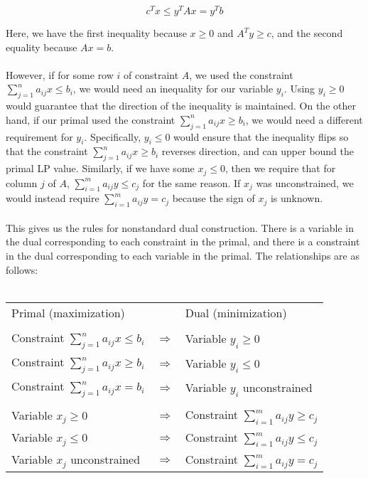 \documentclass[11pt]{article}
\begin{document}
$$ c^Tx \leq y^TAx = y^Tb $$

Here, we have the first inequality because $x \geq 0$ and $A^Ty \geq
c$, and the second equality because $Ax = b$.
\\
\\
However, if for some row $i$ of constraint $A$, we used the
constraint $\sum_{j=1}^n a_{ij} x \leq b_i$, we would need an
inequality for our variable $y_i$. Using $y_i \geq 0$ would
guarantee that the direction of the inequality is maintained. On the
other hand, if our primal used the constraint $\sum_{j=1}^n a_{ij} x
\geq b_i$, we would need a different requirement for $y_i$.
Specifically, $y_i \leq 0$ would ensure that the inequality flips so
that the constraint $\sum_{j=1}^n a_{ij} x \geq b_i$ reverses
direction, and can upper bound the primal LP value. Similarly, if we
have some $x_j \leq 0$, then we require that for column $j$ of $A$,
$\sum_{i=1}^m a_{ij} y\leq c_j$ for the same reason. If $x_j$ was
unconstrained, we would instead require $\sum_{i=1}^m a_{ij} y =
c_j$ because the sign of $x_j$ is unknown.
\\
\\
This gives us the rules for nonstandard dual construction. There is
a variable in the dual corresponding to each constraint in the
primal, and there is a constraint in the dual corresponding to each
variable in the primal. The relationships are as follows:
\\
\\
\begin{tabular}{lll}
Primal (maximization) & & Dual (minimization) \\
\\
Constraint $\sum_{j=1}^n a_{ij} x \leq b_i$ & $\Rightarrow$ & Variable $y_i \geq 0$\\
Constraint $\sum_{j=1}^n a_{ij} x \geq b_i$ & $\Rightarrow$ & Variable $y_i \leq 0$\\
Constraint $\sum_{j=1}^n a_{ij} x = b_i$ & $\Rightarrow$ & Variable $y_i$ unconstrained\\
\\
Variable $x_j \geq 0$ & $\Rightarrow$ & Constraint $\sum_{i=1}^m
a_{ij} y \geq c_j$\\
Variable $x_j \leq 0$ & $\Rightarrow$ & Constraint $\sum_{i=1}^m
a_{ij} y \leq c_j$\\
Variable $x_j$ unconstrained & $\Rightarrow$ & Constraint
$\sum_{i=1}^m a_{ij} y = c_j$\\
\end{tabular}
\\
\\
\end{document}
